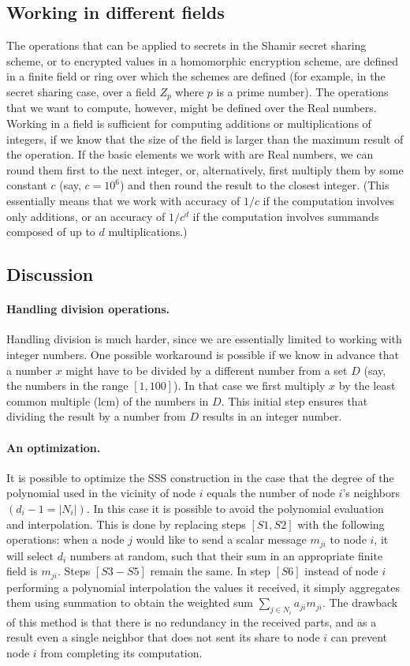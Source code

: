 \documentclass[10pt]{svjour3}
\begin{document}
\subsection{Working in different fields}
The operations that can be applied to secrets in the Shamir secret
sharing scheme, or to encrypted values in a homomorphic encryption
scheme, are defined in a finite field or ring over which the schemes
are defined (for example, in the secret sharing case, over a field
$Z_p$ where $p$ is a prime number). The operations that we want to
compute, however, might be defined over the Real numbers.  Working
in a field is sufficient for computing additions or
multiplications of integers, if we know that the size of the field
is larger than the maximum result of the operation. If the basic
elements we work with are Real numbers, we can round them first to
the next integer, or, alternatively, first multiply them by some
constant $c$ (say, $c=10^6$) and then round the result to the
closest integer. (This essentially means that we work with
accuracy of $1/c$ if the computation involves only additions, or
an accuracy of $1/c^d$ if the computation involves summands
composed of up to $d$ multiplications.)

\subsection{Discussion}
\paragraph{Handling division operations.}
Handling division is much harder, since  we are essentially limited
to working with integer numbers. One possible workaround is
possible if we know in advance that a number $x$ might have to be
divided by a different number from a set $D$ (say, the numbers in
the range $[1,100]$). In that case we first multiply $x$ by the
least common multiple (lcm) of the numbers in $D$. This initial
step ensures that dividing the result by a number from $D$ results
in an integer number.

\paragraph{An optimization.}
It is possible to optimize the SSS construction in the case that
the degree of the polynomial used in the vicinity of node $i$
equals the number of node $i$'s neighbors $(d_i - 1 = |N_i|)$. In
this case it is possible to avoid the polynomial evaluation and
interpolation. This is done by replacing steps $[S1,S2]$ with the
following operations: when a node $j$ would like to send a scalar
message $m_{ji}$ to node $i$, it will select $d_i$ numbers at
random, such that their sum in an appropriate finite field is
$m_{ji}$. Steps $[S3-S5]$ remain the same. In step $[S6]$ instead
of node $i$ performing a polynomial interpolation the values it
received, it simply aggregates them using summation to obtain the
weighted sum $\sum_{j \in N_i} a_{ji} m_{ji}$. The drawback of
this method is that there is no redundancy in the received parts,
and as a result even a single neighbor that does not sent its
share to node $i$ can prevent node $i$ from completing its
computation.
\end{document}
